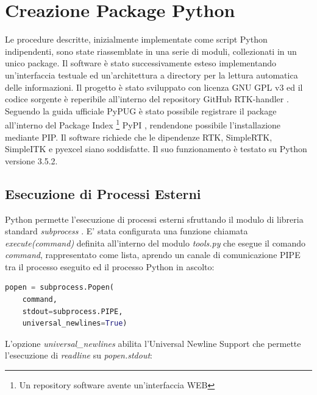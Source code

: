\documentclass[a4paper,12pt, doubleside]{report}
\begin{document}
    \chapter{Creazione Package Python}
    \label{cap:rtk-handler}
        \par
            Le procedure descritte, inizialmente implementate come script Python indipendenti, sono state riassemblate in una serie di moduli, collezionati in un unico package. Il software è stato successivamente esteso implementando un'interfaccia testuale ed un'architettura a directory per la lettura automatica delle informazioni. Il progetto è stato sviluppato con licenza GNU GPL v3 \cite{gpl-v3} ed il codice sorgente è reperibile all'interno del repository GitHub RTK-handler \cite{rtk-handler-source}. Seguendo la guida ufficiale PyPUG \cite{python-packaging} è stato possibile registrare il package all'interno del Package Index \footnote{Un repository software avente un'interfaccia WEB} PyPI \cite{rtk-handler-pypi}, rendendone possibile l'installazione mediante PIP. Il software richiede che le dipendenze RTK, SimpleRTK, SimpleITK e pyexcel siano soddisfatte. Il suo funzionamento è testato su Python versione 3.5.2.
            
        \section{Esecuzione di Processi Esterni}
        \label{esecuzione-processi-esterni}
            \par
                Python permette l'esecuzione di processi esterni sfruttando il modulo di libreria standard \textit{subprocess} \cite{python-subprocess}. E' stata configurata una funzione chiamata \textit{execute(command)} definita all'interno del modulo \textit{tools.py} che esegue il comando \textit{command}, rappresentato come lista, aprendo un canale di comunicazione PIPE tra il processo eseguito ed il processo Python in ascolto:
                        
                \begin{lstlisting}[language=python, frame=bt]
popen = subprocess.Popen(
    command,
    stdout=subprocess.PIPE,
    universal_newlines=True)
                \end{lstlisting}
                        
                L'opzione \textit{universal\_newlines} abilita l'Universal Newline Support \cite{python-UNS} che permette l'esecuzione di \textit{readline} su \textit{popen.stdout}:
\end{document}
